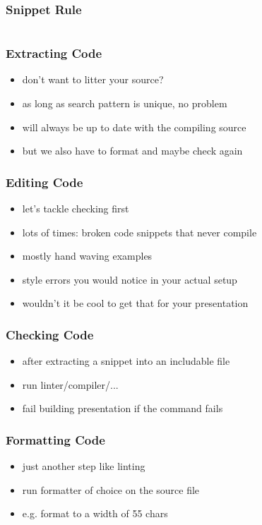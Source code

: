 \documentclass{beamer}
\begin{document}
\begin{frame}
  \frametitle{Snippet Rule}
  \begin{center}
    \inputminted[autogobble]{haskell}{snippets/haskell-snippet-rule.hs}
  \end{center}
\end{frame}

\begin{frame}
  \frametitle{Extracting Code}
  \begin{itemize}
  \item don't want to litter your source?
  \item as long as search pattern is unique, no problem
  \item will always be up to date with the compiling source
  \item but we also have to format and maybe check again
  \end{itemize}
\end{frame}

\begin{frame}
  \frametitle{Editing Code}
  \begin{itemize}
  \item let's tackle checking first
  \item lots of times: broken code snippets that never compile
  \item mostly hand waving examples
  \item style errors you would notice in your actual setup
  \item wouldn't it be cool to get that for your presentation
  \end{itemize}
\end{frame}

\begin{frame}
  \frametitle{Checking Code}
  \begin{itemize}
  \item after extracting a snippet into an includable file
  \item run linter/compiler/...
  \item fail building presentation if the command fails
  \end{itemize}
\end{frame}

\begin{frame}
  \frametitle{Formatting Code}
  \begin{itemize}
  \item just another step like linting
  \item run formatter of choice on the source file
  \item e.g. format to a width of 55 chars
  \end{itemize}
\end{frame}
\end{document}
